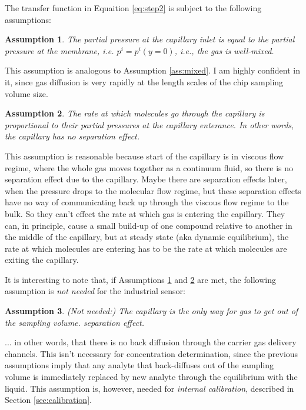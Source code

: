 \documentclass{article}
\newtheorem{assumption}{Assumption}
\begin{document}
The transfer function in Equaition \ref{eq:step2} is subject to the following assumptions:
\begin{assumption}
	The partial pressure at the capillary inlet is equal to the partial pressure at the membrane, i.e. $p^i=p^i(y\!=\!0)$, i.e., the gas is well-mixed.\label{ass:mixed_p}
\end{assumption}
This assumption is analogous to Assumption \ref{ass:mixed}. I am highly confident in it, since gas diffusion is very rapidly at the length scales of the chip sampling volume size.

\begin{assumption}
	The rate at which molecules go through the capillary is proportional to their partial pressures at the capillary enterance. In other words, the capillary has no \textit{separation} effect.\label{ass:no_separation}
\end{assumption}
This assumption is reasonable because start of the capillary is in viscous flow regime, where the whole gas moves together as a continuum fluid, so there is no separation effect due to the capillary. Maybe there are separation effects later, when the pressure drops to the molecular flow regime, but these separation effects have no way of communicating back up through the viscous flow regime to the bulk. So they can't effect the rate at which gas is entering the capillary. They can, in principle, cause a small build-up of one compound relative to another in the middle of the capillary, but at steady state (aka dynamic equilibrium), the rate at which molecules are entering has to be the rate at which molecules are exiting the capillary. 

It is interesting to note that, if Assumptions \ref{ass:mixed_p} and \ref{ass:no_separation} are met, the following assumption is \textit{not needed} for the industrial sensor:
\begin{assumption}
	(Not needed:) The capillary is the only way for gas to get out of the sampling volume. \textit{separation} effect.\label{ass:no_back_diffusion}
\end{assumption}
... in other words, that there is no back diffusion through the carrier gas delivery channels. This isn't necessary for concentration determination, since the previous assumptions imply that any analyte that back-diffuses out of the sampling volume is immediately replaced by new analyte through the equilibrium with the liquid. This assumption is, however, needed for \textit{internal calibration}, described in Section \ref{sec:calibration}.
\end{document}
